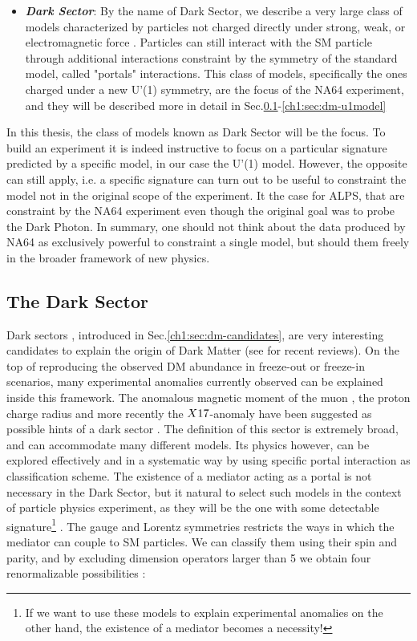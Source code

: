 \begin{itemize}
\item \textbf{\textit{Dark Sector}}: By the name of Dark Sector, we describe a very large class of models characterized by particles not charged directly under strong, weak, or electromagnetic force \cite{alex2016dark}. Particles can still interact with the SM particle through additional interactions constraint by the symmetry of the standard model, called "portals" interactions. This class of models, specifically the ones charged under a new U'(1) symmetry, are the focus of the NA64 experiment, and they will be described more in detail in Sec.\ref{ch1:sec:dm-sector}-\ref{ch1:sec:dm-u1model}
\end{itemize}

In this thesis, the class of models known as Dark Sector will be the focus. To build an experiment it is indeed instructive to focus on a particular signature predicted by a specific model, in our case the U'(1) model. However, the opposite can still apply, i.e. a specific signature can turn out to be useful to constraint the model not in the original scope of the experiment. It the case for ALPS, that are constraint by the NA64 experiment even though the original goal was to probe the Dark Photon. In summary, one should not think about the data produced by NA64 as exclusively powerful to constraint a single model, but should them freely in the broader framework of new physics.

\subsection{The Dark Sector}
\label{ch1:sec:dm-sector}

Dark sectors , introduced in Sec.\ref{ch1:sec:dm-candidates}, are very interesting candidates to explain the origin of Dark Matter (see \cite{battaglieri2017cosmic,alex2016dark} for recent reviews). On the top of reproducing the observed DM abundance in freeze-out or freeze-in scenarios, many experimental anomalies currently observed can be explained inside this framework. The anomalous magnetic moment of the muon \cite{blum2013muon}, the proton charge radius \cite{Pohl2010} and more recently the $X17$-anomaly \cite{Krasznahorkay:2015iga,Krasznahorkay:2019lyl} have been suggested as possible hints of a dark sector \cite{alex2016dark}. The definition of this sector is extremely broad, and can accommodate many different models. Its physics however, can be explored effectively and in a systematic way by using specific portal interaction as classification scheme.  The existence of a mediator acting as a portal is not necessary in the Dark Sector, but it natural to select such models in the context of particle physics experiment, as they will be the one with some detectable signature\footnote{If we want to use these models to explain experimental anomalies on the other hand, the existence of a mediator becomes a necessity!} \cite{prw, pospelov}. The gauge and Lorentz symmetries restricts the ways in which the mediator can couple to SM particles. We can classify them using their spin and parity, and by excluding dimension operators larger than 5 we obtain four renormalizable possibilities \cite{alex2016dark}:

